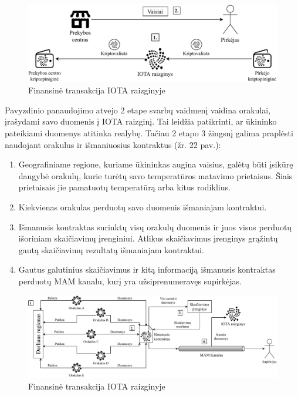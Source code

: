 \begin{figure}[H]
    \centering
    \includegraphics[scale=0.75]{images/tangle-financial-transaction}
    \caption{Finansinė transakcija IOTA raizginyje}
\end{figure}

Pavyzdinio panaudojimo atvejo 2 etape svarbų vaidmenį vaidina orakulai, įrašydami savo duomenis į IOTA raizginį. Tai leidžia patikrinti, ar ūkininko pateikiami duomenys atitinka realybę. Tačiau 2 etapo 3 žingsnį galima praplėsti naudojant orakulus ir išmaniuosius kontraktus (žr. 22 pav.): 
\begin{enumerate}
    \item Geografiniame regione, kuriame ūkininkas augina vaisius, galėtų būti įsikūrę daugybė orakulų, kurie turėtų savo temperatūros matavimo prietaisus. Šiais prietaisais jie pamatuotų temperatūrą arba kitus rodiklius.
    \item Kiekvienas orakulas perduotų savo duomenis išmaniajam kontraktui.
    \item Išmanusis kontraktas surinktų visų orakulų duomenis ir juos visus perduotų išoriniam skaičiavimų įrenginiui. Atlikus skaičiavimus įrenginys grąžintų gautą skaičiavimų rezultatą išmaniajam kontraktui.
    \item Gautus galutinius skaičiavimus ir kitą informaciją išmanusis kontraktas perduotų MAM kanalu, kurį yra užsiprenumeravęs supirkėjas.
\end{enumerate}

\begin{figure}[H]
    \centering
    \includegraphics[scale=0.63]{images/tangle-smart-contract}
    \caption{Finansinė transakcija IOTA raizginyje}
\end{figure}